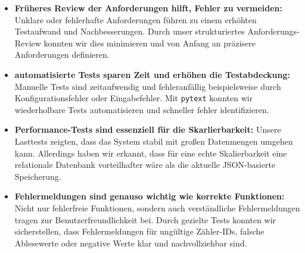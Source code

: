 \begin{itemize}
    \item \textbf{Früheres Review der Anforderungen hilft, Fehler zu vermeiden:} Unklare oder fehlerhafte Anforderungen führen zu einem erhöhten Testaufwand und Nachbesserungen.
    Durch unser strukturiertes Anforderungs-Review konnten wir dies minimieren und von Anfang an präzisere Anforderungen definieren.
    \item \textbf{automatisierte Tests sparen Zeit und erhöhen die Testabdeckung:} Manuelle Tests sind zeitaufwendig und fehleranfällig beispielsweise durch Konfigurationsfehler oder Eingabefehler.
    Mit \texttt{pytext} konnten wir wiederholbare Tests automatisieren und schneller fehler identifizieren.
    \item \textbf{Performance-Tests sind essenziell für die Skarlierbarkeit:} Unsere Lasttests zeigten, dass das System stabil mit großen Datenmengen umgehen kann.
    Allerdings haben wir erkannt, dass für eine echte Skalierbarkeit eine relationale Datenbank vorteilhafter wäre als die aktuelle JSON-basierte Speicherung.
    \item \textbf{Fehlermeldungen sind genauso wichtig wie korrekte Funktionen:} Nicht nur fehlerfreie Funktionen, sondern auch verständliche Fehlermeldungen tragen zur Benutzerfreundlichkeit bei.
    Durch gezielte Tests konnten wir sicherstellen, dass Fehlermeldungen für ungültige Zähler-IDs, falsche Ablesewerte oder negative Werte klar und nachvollziehbar sind.
\end{itemize}
